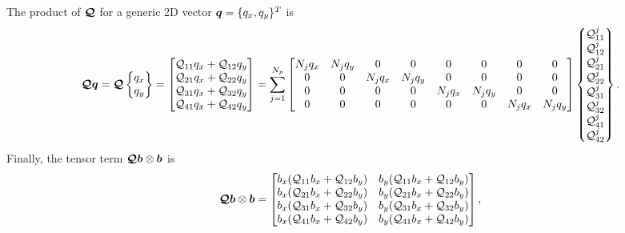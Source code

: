\documentclass[a4paper,10pt]{article}
\newcommand{\bm}[1]{\text{\boldmath$#1$\unboldmath}}
\renewcommand{\b}{\bm{b}}
\newcommand{\SecOrdTens}[1]{\bm{\mathcal{#1}}}
\newcommand{\G}{\SecOrdTens{Q}}
\begin{document}
The product of $\G$ for a generic 2D vector $\bm{q} = \{q_x,q_y\}^T$ is
\[
 \G \bm{q} =  \G
  \begin{Bmatrix}
  q_x\\
  q_y
 \end{Bmatrix}=
 \begin{bmatrix}
  \mathcal{Q}_{11}q_x + \mathcal{Q}_{12}q_y \\
  \mathcal{Q}_{21}q_x + \mathcal{Q}_{22}q_y \\
  \mathcal{Q}_{31}q_x + \mathcal{Q}_{32}q_y \\
  \mathcal{Q}_{41}q_x + \mathcal{Q}_{42}q_y \\
 \end{bmatrix} 
=\sum_{j=1}^{N_p}
\begin{bmatrix}
    N_j q_x   &    N_j q_y   &       0     &       0       &       0     &       0      &       0     &       0\\ 
       0      &      0       &    N_j q_x  &     N_j q_y   &       0     &       0      &       0     &       0\\ 
       0      &      0       &       0     &       0       &   N_j q_x   &    N_j q_y   &       0     &       0\\ 
       0      &      0       &       0     &       0       &       0     &       0      &    N_j q_x   &    N_j q_y
\end{bmatrix}  
\begin{Bmatrix}
  \mathcal{Q}_{11}^j\\
  \mathcal{Q}_{12}^j\\
  \mathcal{Q}_{21}^j\\
  \mathcal{Q}_{22}^j\\               
  \mathcal{Q}_{31}^j\\
  \mathcal{Q}_{32}^j\\
  \mathcal{Q}_{41}^j\\
  \mathcal{Q}_{42}^j
\end{Bmatrix}.
\]
Finally, the tensor term $\G \b \otimes \b$ is 
\[
\G \b \otimes \b =
\begin{bmatrix}
  b_x (\mathcal{Q}_{11}b_x + \mathcal{Q}_{12}b_y ) & b_y (\mathcal{Q}_{11}b_x + \mathcal{Q}_{12}b_y ) \\
  b_x (\mathcal{Q}_{21}b_x + \mathcal{Q}_{22}b_y ) & b_y (\mathcal{Q}_{21}b_x + \mathcal{Q}_{22}b_y ) \\
  b_x (\mathcal{Q}_{31}b_x + \mathcal{Q}_{32}b_y ) & b_y (\mathcal{Q}_{31}b_x + \mathcal{Q}_{32}b_y ) \\
  b_x (\mathcal{Q}_{41}b_x + \mathcal{Q}_{42}b_y ) & b_y (\mathcal{Q}_{41}b_x + \mathcal{Q}_{42}b_y ) \\
\end{bmatrix},
\]
\end{document}
